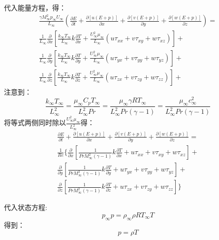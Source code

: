 \documentclass[12pt, a4paper]{article}
\begin{document}
代入能量方程，得：
    \begin{equation}
        \begin{gathered}
            \frac{\gamma M_{\infty}^{2}p_{\infty}U_{\infty}}{L_{\infty}}(\frac{\partial E}{\partial t} + \frac{\partial[u(E+p)]}{\partial x} + \frac{\partial[v(E+p)]}{\partial y} + \frac{\partial[w(E+p)]}{\partial z}) = \\
            \frac{1}{L_{\infty}}\frac{\partial}{\partial x}[\frac{k_{\infty}T_{\infty}}{L_{\infty}}k\frac{\partial T}{\partial x} + \frac{U_{\infty}^2\mu_{\infty}}{L_{\infty}}(u\tau_{xx} + v\tau_{xy} + w\tau_{xz})] + \\
            \frac{1}{L_{\infty}}\frac{\partial}{\partial y}[\frac{k_{\infty}T_{\infty}}{L_{\infty}}k\frac{\partial T}{\partial y} + \frac{U_{\infty}^2\mu_{\infty}}{L_{\infty}}(u\tau_{yx} + v\tau_{yy} + w\tau_{yz})] +\\
            \frac{1}{L_{\infty}}\frac{\partial}{\partial z}[\frac{k_{\infty}T_{\infty}}{L_{\infty}}k\frac{\partial T}{\partial z} + \frac{U_{\infty}^2\mu_{\infty}}{L_{\infty}}(u\tau_{zx} + v\tau_{zy} + w\tau_{zz})] +
        \end{gathered}
    \end{equation}
注意到：
    \begin{equation}
        \frac{k_{\infty}{T_\infty}}{L^2_{\infty}} = \frac{\mu_{\infty}C_pT_{\infty}}{L_{\infty}^2Pr} = \frac{\mu_{\infty}\gamma RT_{\infty}}{L_{\infty}^2Pr(\gamma - 1)} = \frac{\mu_{\infty}c_{\infty}^2}{L_{\infty}^2Pr(\gamma - 1)}
    \end{equation}
将等式两侧同时除以$\frac{U_{\infty}^2\mu_{\infty}}{L_{\infty}^2}$得：
    \begin{equation}
        \begin{gathered}
            \frac{\partial E}{\partial t} + \frac{\partial[u(E+p)]}{\partial x} + \frac{\partial[v(E+p)]}{\partial y} + \frac{\partial[w(E+p)]}{\partial z} = \\
            \frac{1}{Re}\{ \frac{\partial}{\partial x}[\frac{1}{PrM^2_{\infty}(\gamma-1)}k\frac{\partial T}{\partial x} + u\tau_{xx} + v\tau_{xy} + w\tau_{xz}] + \\
            \frac{\partial}{\partial y}[\frac{1}{PrM^2_{\infty}(\gamma-1)}k\frac{\partial T}{\partial y} + u\tau_{yx} + v\tau_{yy} + w\tau_{yz}] + \\
            \frac{\partial}{\partial z}[\frac{1}{PrM^2_{\infty}(\gamma-1)}k\frac{\partial T}{\partial z} + u\tau_{zx} + v\tau_{zy} + w\tau_{zz}]\} 
        \end{gathered}
    \end{equation}

代入状态方程:
    \begin{equation}
        p_{\infty}p = \rho_{\infty}\rho R T_{\infty}T
    \end{equation}
得到：
    \begin{equation}
        p = \rho T
    \end{equation}
\end{document}
